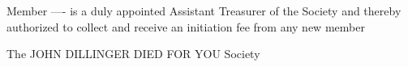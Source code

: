 Member
----
is a duly appointed Assistant Treasurer of the
Society and thereby authorized to collect and
receive an initiation fee from any new member

The
JOHN DILLINGER
DIED FOR YOU
Society

